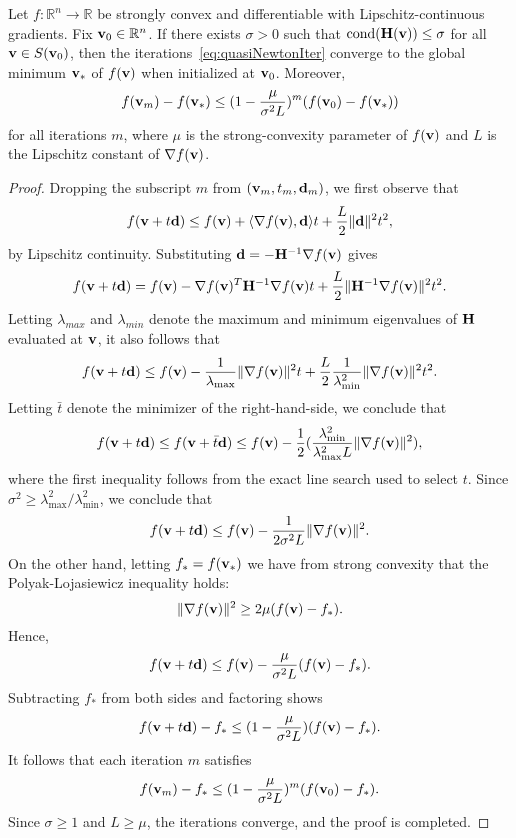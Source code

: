 \begin{lemma}\label{lem:GlobalConv}
  Let $f : \mathbb{R}^n \rightarrow \mathbb{R}$ be strongly convex and differentiable
  with Lipschitz-continuous gradients.
  Fix ${\mathbf{v}}_0 \in\mathbb{R}^n$. If there exists $\sigma > 0$
  such that $\text{cond}({\mathbf{H}}({\mathbf{v}})) \le \sigma$ for all  ${\mathbf{v}} \in S({\mathbf{v}}_0)$, then
  the iterations~\eqref{eq:quasiNewtonIter}
  converge to the global minimum ${\mathbf{v}}_*$ of $f({\mathbf{v}})$ when initialized at ${\mathbf{v}}_0$.
  Moreover,
  \[
    f({\mathbf{v}}_m)  - f({\mathbf{v}}_*)  \le (1-\frac{\mu}{\sigma^2 L})^m (f({\mathbf{v}}_0) - f({\mathbf{v}}_*))
  \]
  for all iterations $m$, where $\mu$ is the strong-convexity parameter of $f({\mathbf{v}})$ and $L$ is
  the Lipschitz constant of $\nabla f({\mathbf{v}})$.
  \begin{proof}
    Dropping the subscript $m$ from $({\mathbf{v}}_m, t_m, {\mathbf{d}}_m)$, we first observe that
\[
f({\mathbf{v}}+t{\mathbf{d}}) \le f({\mathbf{v}}) + \langle \nabla f({\mathbf{v}}), {\mathbf{d}} \rangle t + \frac{L}{2}\|{\mathbf{d}}\|^2 t^2,
\]
by Lipschitz continuity.  Substituting ${\mathbf{d}} =- {\mathbf{H}}^{-1}  \nabla  f({\mathbf{v}})$ gives
\[
f({\mathbf{v}}+t{\mathbf{d}}) = f({\mathbf{v}}) - \nabla f({\mathbf{v}})^T  {\mathbf{H}}^{-1}  \nabla  f({\mathbf{v}}) t + \frac{L }{2}\|{\mathbf{H}}^{-1}\nabla f({\mathbf{v}}) \|^2 t^2.
\]
Letting $\lambda_{max}$ and $\lambda_{min}$ denote the
maximum and minimum eigenvalues of ${\mathbf{H}}$ evaluated at ${\mathbf{v}}$, it also follows that
\[
  f({\mathbf{v}}+t{\mathbf{d}}) \le f({\mathbf{v}}) - \frac{1}{\lambda_{\max}} \|\nabla f({\mathbf{v}})\|^2 t  + 
    \frac{L }{2}  \frac{1}{\lambda^{2}_{\min}} \|\nabla f({\mathbf{v}})\|^2 t^2.
\]
Letting $\bar t$ denote the  minimizer of the right-hand-side, we
conclude that
    \[
      f({\mathbf{v}}+t{\mathbf{d}}) \le  f({\mathbf{v}} + \bar t{\mathbf{d}} ) \le f({\mathbf{v}}) - \frac{1}{2}(\frac{\lambda^{2}_{\min}}{\lambda^2_{\max} L} 
      \|\nabla f({\mathbf{v}})\|^2),
    \]
where the first inequality follows from the exact line search
used to select $t$.
Since  $\sigma^2 \ge \lambda^{2}_{\max}/\lambda^2_{\min}$,
we conclude that
\[
   f({\mathbf{v}} + t {\mathbf{d}}) \le f({\mathbf{v}}) - \frac{1}{2\sigma^2 L}\| \nabla f({\mathbf{v}}) \|^2.
\]
    On the other hand, letting $f_* = f({\mathbf{v}}_*)$ 
    we have from strong convexity that the Polyak-Lojasiewicz
    inequality holds:
    \[
  \|\nabla f({\mathbf{v}})\|^2 \ge 2\mu (f({\mathbf{v}})-f_* ).
    \]
Hence,
\[
  f({\mathbf{v}} + t {\mathbf{d}})   \le f({\mathbf{v}}) - \frac{\mu}{\sigma^2 L} (f({\mathbf{v}})-f_* ).
\]
Subtracting $f_*$ from both sides and factoring shows
\[
  f({\mathbf{v}} + t {\mathbf{d}})  - f_* \le  (1-\frac{\mu}{\sigma^2 L})(f({\mathbf{v}}) - f_*).
\]
It follows that each iteration $m$ satisfies
\[
  f({\mathbf{v}}_{m}) - f_* \le  (1-\frac{\mu}{\sigma^2 L})^{m}(f({\mathbf{v}}_{0}) - f_*).
\]
Since $\sigma \ge 1$ and $L \ge \mu$, the iterations converge, and the proof is completed.
  \end{proof}
\end{lemma}

